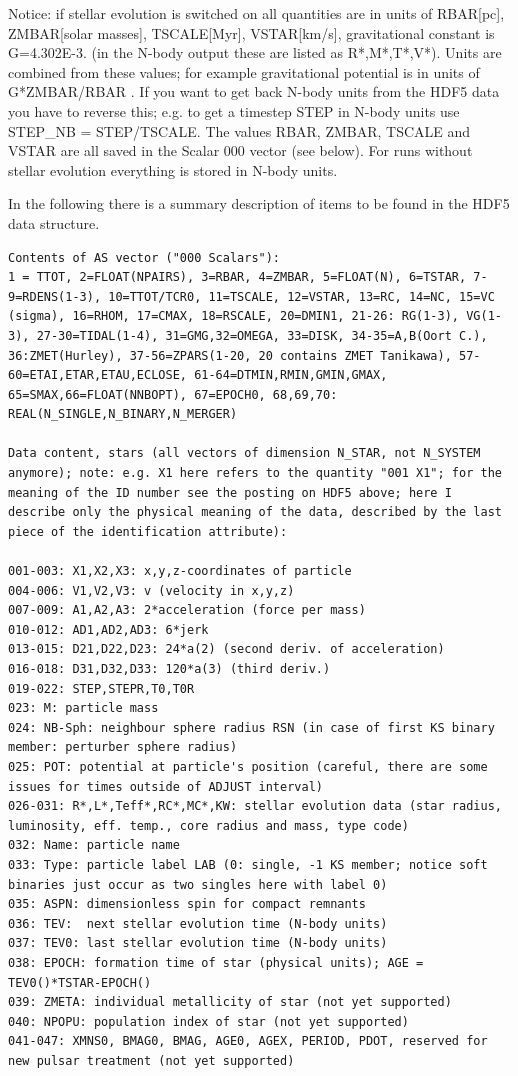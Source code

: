 Notice: if stellar evolution is switched on all quantities are in units of RBAR[pc], ZMBAR[solar masses], TSCALE[Myr], VSTAR[km/s], gravitational constant is G=4.302E-3. (in the N-body output these are listed as R*,M*,T*,V*). Units are combined from these values; for example gravitational potential is in units of G*ZMBAR/RBAR . If you want to get back N-body units from the HDF5 data you have to reverse this; e.g. to get a timestep STEP in N-body units use STEP\_NB = STEP/TSCALE. The values RBAR, ZMBAR, TSCALE and VSTAR are all saved in the Scalar 000 vector (see below). For runs without stellar evolution everything is stored in N-body units.

In the following there is a summary description of items to be found in the HDF5 data structure.

\begin{lstlisting}[breaklines] 
Contents of AS vector ("000 Scalars"):
1 = TTOT, 2=FLOAT(NPAIRS), 3=RBAR, 4=ZMBAR, 5=FLOAT(N), 6=TSTAR, 7-9=RDENS(1-3), 10=TTOT/TCR0, 11=TSCALE, 12=VSTAR, 13=RC, 14=NC, 15=VC (sigma), 16=RHOM, 17=CMAX, 18=RSCALE, 20=DMIN1, 21-26: RG(1-3), VG(1-3), 27-30=TIDAL(1-4), 31=GMG,32=OMEGA, 33=DISK, 34-35=A,B(Oort C.), 36:ZMET(Hurley), 37-56=ZPARS(1-20, 20 contains ZMET Tanikawa), 57-60=ETAI,ETAR,ETAU,ECLOSE, 61-64=DTMIN,RMIN,GMIN,GMAX, 65=SMAX,66=FLOAT(NNBOPT), 67=EPOCH0, 68,69,70: REAL(N_SINGLE,N_BINARY,N_MERGER)

Data content, stars (all vectors of dimension N_STAR, not N_SYSTEM anymore); note: e.g. X1 here refers to the quantity "001 X1"; for the meaning of the ID number see the posting on HDF5 above; here I describe only the physical meaning of the data, described by the last piece of the identification attribute):

001-003: X1,X2,X3: x,y,z-coordinates of particle
004-006: V1,V2,V3: v (velocity in x,y,z)
007-009: A1,A2,A3: 2*acceleration (force per mass)
010-012: AD1,AD2,AD3: 6*jerk
013-015: D21,D22,D23: 24*a(2) (second deriv. of acceleration)
016-018: D31,D32,D33: 120*a(3) (third deriv.)
019-022: STEP,STEPR,T0,T0R
023: M: particle mass
024: NB-Sph: neighbour sphere radius RSN (in case of first KS binary member: perturber sphere radius)
025: POT: potential at particle's position (careful, there are some issues for times outside of ADJUST interval)
026-031: R*,L*,Teff*,RC*,MC*,KW: stellar evolution data (star radius, luminosity, eff. temp., core radius and mass, type code)
032: Name: particle name
033: Type: particle label LAB (0: single, -1 KS member; notice soft binaries just occur as two singles here with label 0)
035: ASPN: dimensionless spin for compact remnants
036: TEV:  next stellar evolution time (N-body units)
037: TEV0: last stellar evolution time (N-body units)
038: EPOCH: formation time of star (physical units); AGE = TEV0()*TSTAR-EPOCH()
039: ZMETA: individual metallicity of star (not yet supported)
040: NPOPU: population index of star (not yet supported)
041-047: XMNS0, BMAG0, BMAG, AGE0, AGEX, PERIOD, PDOT, reserved for new pulsar treatment (not yet supported)


\end{lstlisting}
